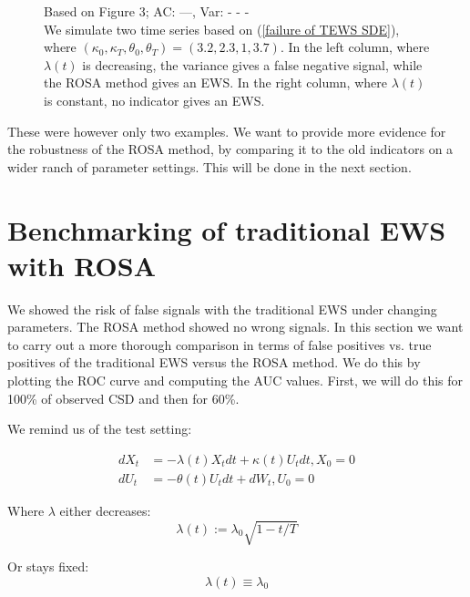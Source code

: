 \documentclass[%
thesis=student,%
coverpage=false,%
titlepage=false,%
headmarks=true, %
english,%
font=libertine, %
math=newpxtx, %
BCOR=5mm,%
coverBCOR=11mm%
]{tumbook}
\begin{document}
\begin{figure}
\begin{minipage}{0.49\textwidth}
    \end{minipage}
    \begin{minipage}{\textwidth}
    \centering
    \caption{Based on \cite{Morr:2024} Figure 3; AC: ---, Var: - - - \\
    We simulate two time series based on (\ref{failure of TEWS SDE}), where $(\kappa_{0},\kappa_{T},\theta_{0},\theta_{T}) = (3.2,2.3,1,3.7)$. In the left column, where $\lambda(t)$ is decreasing, the variance gives a false negative signal, while the ROSA method gives an EWS. In the right column, where $\lambda(t)$ is constant, no indicator gives an EWS. 
    }
    \label{false negative example}
    \end{minipage}    
\end{figure}


These were however only two examples. We want to provide more evidence for the robustness of the ROSA method, by comparing it to the old indicators on a wider ranch of parameter settings. This will be done in the next section.
    


\chapter{Benchmarking of traditional EWS with ROSA}

We showed the risk of false signals with the traditional EWS under changing parameters.
The ROSA method showed no wrong signals.
In this section we want to carry out a more thorough comparison in terms of false positives vs. true positives of the traditional EWS versus the ROSA method. We do this by plotting the ROC curve and computing the AUC values. First, we will do this for 100\% of observed CSD and then for 60\%.

We remind us of the test setting: 

\begin{subequations}
    \begin{align*}
        dX_{t} &= -\lambda(t) X_{t}dt + \kappa(t) U_{t}dt, X_{0} = 0 \\
        dU_{t} &= -\theta(t) U_{t}dt + dW_{t}, U_{0} = 0
    \end{align*}
\end{subequations}

Where $\lambda$ either decreases: 
    \[
    \lambda(t) := \lambda_{0}\sqrt{1-t/T}
    \]

Or stays fixed: 
    \[
    \lambda(t)\equiv\lambda_{0}
    \]
\end{document}
